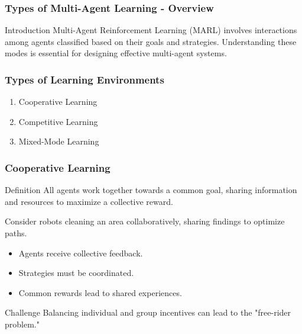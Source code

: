 \documentclass[aspectratio=169]{beamer}
\begin{document}
\begin{frame}[fragile]
    \frametitle{Types of Multi-Agent Learning - Overview}
    \begin{block}{Introduction}
        Multi-Agent Reinforcement Learning (MARL) involves interactions among agents classified based on their goals and strategies. Understanding these modes is essential for designing effective multi-agent systems.
    \end{block}
\end{frame}

\begin{frame}[fragile]
    \frametitle{Types of Learning Environments}
    \begin{enumerate}
        \item Cooperative Learning
        \item Competitive Learning
        \item Mixed-Mode Learning
    \end{enumerate}
\end{frame}

\begin{frame}[fragile]
    \frametitle{Cooperative Learning}
    \begin{block}{Definition}
        All agents work together towards a common goal, sharing information and resources to maximize a collective reward.
    \end{block}
    \begin{example}
        Consider robots cleaning an area collaboratively, sharing findings to optimize paths.
    \end{example}
    \begin{itemize}
        \item Agents receive collective feedback.
        \item Strategies must be coordinated.
        \item Common rewards lead to shared experiences.
    \end{itemize}
    \begin{block}{Challenge}
        Balancing individual and group incentives can lead to the "free-rider problem."
    \end{block}
\end{frame}
\end{document}
